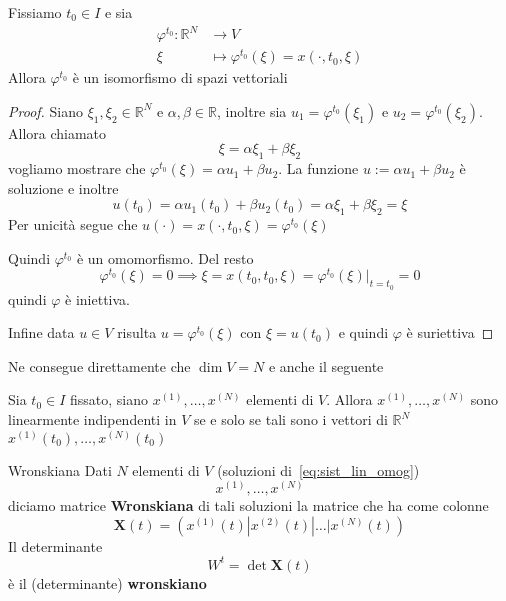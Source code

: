 \begin{proposition}\label{prop:44}
    Fissiamo \(t_{0} \in I\) e sia 
    \begin{align*}
        \varphi^{t_{0}}: \mathbb{R}^{N} &\longrightarrow V \\
        \xi &\longmapsto \varphi^{t_{0}}(\xi) = x{(\cdot , t_{0}, \xi)}
    \end{align*}
    Allora \(\varphi ^{t_{0}}\) è un isomorfismo di spazi vettoriali
\end{proposition}
\begin{proof}
    Siano \(\xi_{1}, \xi_{2} \in \mathbb{R}^{N}\) e \(\alpha, \beta \in
    \mathbb{R}\), inoltre sia \(u_{1} = \varphi ^{t_{0}}{(\xi_{1})}\) e \(u_{2}
    = \varphi ^{t_{0}}{(\xi_{2})}\). Allora chiamato
    \[
      \xi = \alpha \xi_{1} + \beta\xi_{2}
    \]
    vogliamo mostrare che \(\varphi ^{t_{0}}{(\xi)} = \alpha u_{1} + \beta
    u_{2}\). La funzione \(u := \alpha u_{1} + \beta u_{2}\) è soluzione e
    inoltre
    \[
      u{(t_{0})} = \alpha u_{1}{(t_{0})} + \beta u_{2}{(t_{0})} = \alpha
      \xi_{1} + \beta \xi_{2} = \xi
    \]
    Per unicità segue che \(u{(\cdot )} = x{(\cdot , t_{0}, \xi)} = \varphi
    ^{t_{0}}{(\xi)}\) 

    Quindi \(\varphi ^{t_{0}}\) è un omomorfismo. Del resto
    \[
      \varphi ^{t_{0}}{(\xi)} = 0 \implies \xi = x{(t_{0}, t_{0}, \xi)} =
      \varphi ^{t_{0}}{(\xi)}|_{t = t_{0}} = 0
    \]
    quindi \(\varphi \) è iniettiva.

    Infine data \(u \in V\)  risulta \(u =
    \varphi ^{t_{0}}{(\xi)}\) con \(\xi = u{(t_{0})}\) e quindi \(\varphi \) è
    suriettiva
\end{proof}
Ne consegue direttamente che \(\dim V = N\) e anche il seguente
\begin{corollary}
    Sia \(t_{0} \in I\) fissato, siano \(x^{{(1)}}, \dots, x^{{(N)}}\) elementi
    di \(V\). Allora \(x^{{(1)}}, \dots, x^{{(N)}}\) sono linearmente
    indipendenti in \(V\) se e solo se tali sono i vettori di \(\mathbb{R}^{N}\)
    \(x^{{(1)}}{(t_{0})}, \dots, x^{{(N)}}{(t_{0})}\) 
\end{corollary}

\begin{definition}{Wronskiana}
    Dati \(N\) elementi di \(V\) (soluzioni di~\eqref{eq:sist_lin_omog})
    \[
      x^{{(1)}}, \dots, x^{{(N)}}
    \] diciamo matrice \textbf{Wronskiana} di tali soluzioni la matrice che ha
    come colonne
    \[
        \mathbf{X}{(t)} = {(x^{{(1)}}{(t)} | x^{{(2)}}{(t)} | \dots |
        x^{{(N)}}{(t)})}
    \]
    Il determinante
    \[
      W^{t} = \det \mathbf{X}{(t)}
    \]
    è il (determinante) \textbf{wronskiano}
\end{definition}

